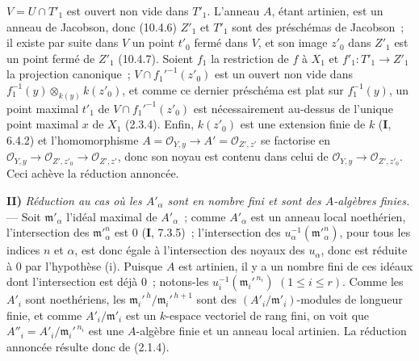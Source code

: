 
$V=U\cap T'_1$ est ouvert non vide dans $T'_1$. L'anneau $A$, étant artinien,
est un anneau de Jacobson, donc (10.4.6) $Z'_1$ et $T'_1$ sont des préschémas de
Jacobson~; il existe par suite dans $V$ un point $t'_0$ fermé dans $V$, et son
image $z'_0$ dans $Z'_1$ est un point fermé de $Z'_1$ (10.4.7). Soient $f_1$ la
restriction de $f$ à $X_1$ et $f'_1:T'_1\to Z'_1$ la projection canonique~;
$V\cap f_1'^{-1}(z'_0)$ est un ouvert non vide dans
$f_1^{-1}(y)\otimes_{k(y)}k(z'_0)$, et comme ce dernier préschéma est plat sur
$f_1^{-1}(y)$, un point maximal $t'_1$ de $V\cap f_1'^{-1}(z'_0)$ est
nécessairement au-dessus de l'unique point maximal $x$ de $X_1$ (2.3.4).
Enfin, $k(z'_0)$ est une extension finie de $k$ (\textbf I, 6.4.2) et
l'homomorphisme $A=\mathcal O_{Y,y}\to A'=\mathcal O_{Z',z'}$ se factorise en
$\mathcal O_{Y,y}\to\mathcal O_{Z',z'_0}\to\mathcal O_{Z',z'}$, donc son noyau
est contenu dans celui de $\mathcal O_{Y,y}\to\mathcal O_{Z',z'_0}$. Ceci
achève la réduction annoncée.

\medskip
\noindent\textbf{II)} \emph{Réduction au cas où les $A'_\alpha$ sont en nombre
fini et sont des $A$-algèbres finies.} --- Soit $\mathfrak m'_\alpha$ l'idéal
maximal de $A'_\alpha$~; comme $A'_\alpha$ est un anneau local noethérien,
l'intersection des $\mathfrak m'^n_\alpha$ est $0$ (\textbf I, 7.3.5)~;
l'intersection des $u_\alpha^{-1}(\mathfrak m'^n_\alpha)$, pour tous les indices
$n$ et $\alpha$, est donc égale à l'intersection des noyaux des $u_\alpha$, donc
est réduite à $0$ par l'hypothèse (i). Puisque $A$ est artinien, il y a un nombre
fini de ces idéaux dont l'intersection est déjà $0$~; notons-les
$u_i^{-1}(\mathfrak m_i'^{\,n_i})$ $(1\leq i\leq r)$. Comme les $A'_i$ sont
noethériens, les $\mathfrak m_i'^{\,h}/\mathfrak m_i'^{\,h+1}$ sont des
$(A'_i/\mathfrak m'_i)$-modules de longueur finie, et comme
$A'_i/\mathfrak m'_i$ est un $k$-espace vectoriel de rang fini, on voit que
$A''_i=A'_i/\mathfrak m_i'^{\,n_i}$ est une $A$-algèbre finie et un anneau local
artinien. La réduction annoncée résulte donc de (2.1.4).

